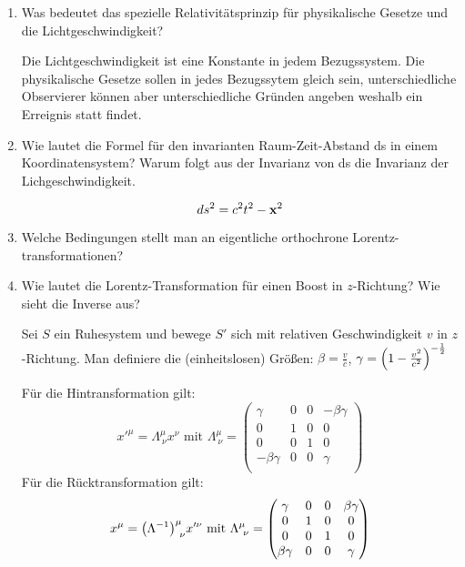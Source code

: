 \begin{enumerate}
  \item Was bedeutet das spezielle Relativitätsprinzip für physikalische
    Gesetze und die Lichtgeschwindigkeit?

    Die Lichtgeschwindigkeit ist eine Konstante in jedem Bezugssystem.
    Die physikalische Gesetze sollen in jedes Bezugssytem gleich sein,
    unterschiedliche Observierer können aber unterschiedliche Gründen
    angeben weshalb ein Erreignis statt findet.

  \item Wie lautet die Formel für den invarianten Raum-Zeit-Abstand ds in
    einem Koordinatensystem? Warum folgt aus der Invarianz von ds die
    Invarianz der Lichgeschwindigkeit.
    
    \begin{equation*}
      ds^2 = c^2 t^2 - \vb x^2
    \end{equation*}

  \item Welche Bedingungen stellt man an eigentliche orthochrone
    Lorentz-transformationen?


  \item Wie lautet die Lorentz-Transformation für einen Boost in 
    $z$-Richtung? Wie sieht die Inverse aus?
    
    Sei $S$ ein Ruhesystem und bewege $S'$ sich mit relativen 
    Geschwindigkeit $v$ in $z$-Richtung. Man definiere die (einheitslosen)
    Größen:
    $\beta = \frac{v}{c}$, $\gamma=\qty(1-\frac{v^2}{c^2})^{-\frac{1}{2}}$
    
    Für die Hintransformation gilt:
    \begin{equation*}
      x'^\mu = \Lambda^\mu_{\ \nu} x^\nu 
      \text{ mit } 
      \Lambda^\mu_{\ \nu}=
      \begin{pmatrix}
        \gamma       & 0 & 0 & -\beta\gamma\\
        0            & 1 & 0 & 0           \\
        0            & 0 & 1 & 0           \\
        -\beta\gamma & 0 & 0 & \gamma      \\
      \end{pmatrix}
    \end{equation*}
    Für die Rücktransformation gilt:
    \begin{equation*}
      x^\mu = \qty(\Lambda^{-1})^\mu_{\ \nu} x'^\nu 
      \text{ mit } 
      \Lambda^\mu_{\ \nu}=
      \begin{pmatrix}
        \gamma       & 0 & 0 & \beta\gamma\\
        0            & 1 & 0 & 0           \\
        0            & 0 & 1 & 0           \\
        \beta\gamma  & 0 & 0 & \gamma      \\
      \end{pmatrix}
    \end{equation*}


\end{enumerate}
